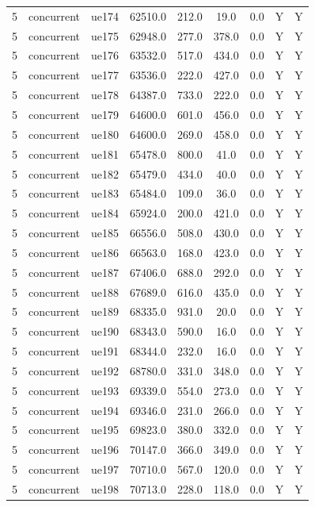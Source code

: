 \begin{table}[ht]
\begin{tabular}{|c|c|c|c|c|c|c|c|c|}
5 & concurrent & ue174 & 62510.0 & 212.0 & 19.0 & 0.0 & Y & Y \\
5 & concurrent & ue175 & 62948.0 & 277.0 & 378.0 & 0.0 & Y & Y \\
5 & concurrent & ue176 & 63532.0 & 517.0 & 434.0 & 0.0 & Y & Y \\
5 & concurrent & ue177 & 63536.0 & 222.0 & 427.0 & 0.0 & Y & Y \\
5 & concurrent & ue178 & 64387.0 & 733.0 & 222.0 & 0.0 & Y & Y \\
5 & concurrent & ue179 & 64600.0 & 601.0 & 456.0 & 0.0 & Y & Y \\
5 & concurrent & ue180 & 64600.0 & 269.0 & 458.0 & 0.0 & Y & Y \\
5 & concurrent & ue181 & 65478.0 & 800.0 & 41.0 & 0.0 & Y & Y \\
5 & concurrent & ue182 & 65479.0 & 434.0 & 40.0 & 0.0 & Y & Y \\
5 & concurrent & ue183 & 65484.0 & 109.0 & 36.0 & 0.0 & Y & Y \\
5 & concurrent & ue184 & 65924.0 & 200.0 & 421.0 & 0.0 & Y & Y \\
5 & concurrent & ue185 & 66556.0 & 508.0 & 430.0 & 0.0 & Y & Y \\
5 & concurrent & ue186 & 66563.0 & 168.0 & 423.0 & 0.0 & Y & Y \\
5 & concurrent & ue187 & 67406.0 & 688.0 & 292.0 & 0.0 & Y & Y \\
5 & concurrent & ue188 & 67689.0 & 616.0 & 435.0 & 0.0 & Y & Y \\
5 & concurrent & ue189 & 68335.0 & 931.0 & 20.0 & 0.0 & Y & Y \\
5 & concurrent & ue190 & 68343.0 & 590.0 & 16.0 & 0.0 & Y & Y \\
5 & concurrent & ue191 & 68344.0 & 232.0 & 16.0 & 0.0 & Y & Y \\
5 & concurrent & ue192 & 68780.0 & 331.0 & 348.0 & 0.0 & Y & Y \\
5 & concurrent & ue193 & 69339.0 & 554.0 & 273.0 & 0.0 & Y & Y \\
5 & concurrent & ue194 & 69346.0 & 231.0 & 266.0 & 0.0 & Y & Y \\
5 & concurrent & ue195 & 69823.0 & 380.0 & 332.0 & 0.0 & Y & Y \\
5 & concurrent & ue196 & 70147.0 & 366.0 & 349.0 & 0.0 & Y & Y \\
5 & concurrent & ue197 & 70710.0 & 567.0 & 120.0 & 0.0 & Y & Y \\
5 & concurrent & ue198 & 70713.0 & 228.0 & 118.0 & 0.0 & Y & Y \\

\end{tabular}
\end{table}

